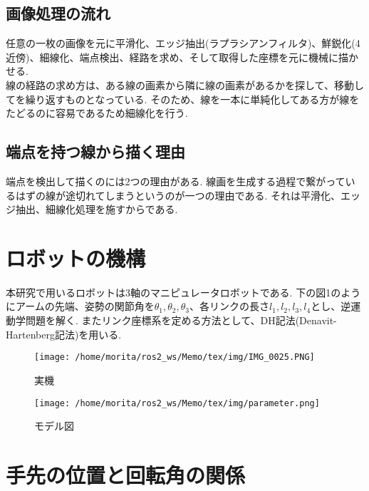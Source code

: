 \documentclass[a4j]{jarticle}			%
\begin{document}
\begin{multicols}{2}
\subsection{画像処理の流れ}
任意の一枚の画像を元に平滑化、エッジ抽出(ラプラシアンフィルタ)、鮮鋭化(4近傍)、細線化、端点検出、経路を求め、そして取得した座標を元に機械に描かせる.\\ 
線の経路の求め方は、ある線の画素から隣に線の画素があるかを探して、移動してを繰り返すものとなっている.
そのため、線を一本に単純化してある方が線をたどるのに容易であるため細線化を行う.


\subsection{端点を持つ線から描く理由}
端点を検出して描くのには2つの理由がある.
線画を生成する過程で繋がっているはずの線が途切れてしまうというのが一つの理由である.
それは平滑化、エッジ抽出、細線化処理を施すからである.

\end{multicols}
\section{ロボットの機構}
本研究で用いるロボットは3軸のマニピュレータロボットである.
下の図1のようにアームの先端、姿勢の関節角を$\theta_1, \theta_2, \theta_3$、各リンクの長さ$l_1, l_2, l_3, l_4$とし、逆運動学問題を解く.
またリンク座標系を定める方法として、DH記法(Denavit-Hartenberg記法)を用いる.


\begin{figure}[htbp]
\begin{center}
\texttt{[image: /home/morita/ros2\_ws/Memo/tex/img/IMG\_0025.PNG]}
\caption{実機}
\end{center}
\end{figure}

\begin{figure}[htbp]
\begin{center}
\texttt{[image: /home/morita/ros2\_ws/Memo/tex/img/parameter.png]}
\caption{モデル図}
\end{center}
\end{figure}


\section{手先の位置と回転角の関係}
\end{document}
